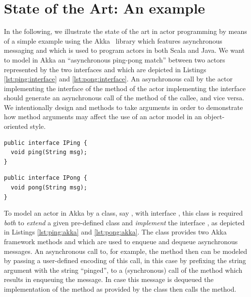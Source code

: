 \section{State of the Art: An example}
\label{sec:example}
In the following, we illustrate the state of the art in actor programming by means of a simple example using
the Akka~\cite{akka} library which features asynchronous messaging and which is used to program actors in both Scala and Java.
We want to model in Akka an ``asynchronous ping-pong match'' between two actors represented by the 
two interfaces  and  which are depicted in Listings \ref{lst:ping:interface} and \ref{lst:pong:interface}.
An asynchronous call by the actor implementing the  interface of the  method of the actor
implementing the  interface should generate an asynchronous call of the  method of the callee,
and vice versa.
We intentionally design  and  methods to take  arguments in order to demonstrate 
how method arguments may affect the use of an actor model in an object-oriented style.





\lstset{language=Java}
\begin{center}
\begin{minipage}[t]{0.48\textwidth}
\begin{lstlisting}[caption=Ping as an interface,label=lst:ping:interface]
public interface IPing {
  void ping(String msg);
}
\end{lstlisting}
\end{minipage}
\hfill
\begin{minipage}[t]{0.48\textwidth}
\begin{lstlisting}[caption=Pong as an interface,label=lst:pong:interface]
public interface IPong {
  void pong(String msg);
}
\end{lstlisting}
\end{minipage}
\end{center}

To model an actor in Akka by a class, say  ,  with interface , this class is required  \emph{both} to \emph{extend}
a given pre-defined  class   and \emph{implement} the interface , 
as depicted in Listings \ref{lst:ping:akka} and \ref{lst:pong:akka}.
The class  provides two Akka framework methods  and  
which are used to enqueue and dequeue asynchronous messages.
An asynchronous call to, for example,  the method  then can be modeled by passing a user-defined  encoding of this call,
in this case by prefixing the string argument with the string ``pinged'', to a (synchronous) call
of the  method which results in enqueuing the message.
In case this message is dequeued
the implementation of the  method as provided by the  class then calls the  method.


